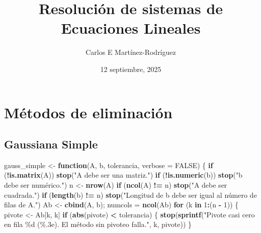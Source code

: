 \documentclass[
]{book}
\title{Resolución de sistemas de Ecuaciones Lineales}
\author{Carlos E Martínez-Rodríguez}
\date{12 septiembre, 2025}
\newenvironment{Shaded}{\begin{snugshade}}{\end{snugshade}}
\newcommand{\AttributeTok}[1]{\textcolor[rgb]{0.13,0.29,0.53}{#1}}
\newcommand{\ConstantTok}[1]{\textcolor[rgb]{0.56,0.35,0.01}{#1}}
\newcommand{\ControlFlowTok}[1]{\textcolor[rgb]{0.13,0.29,0.53}{\textbf{#1}}}
\newcommand{\DecValTok}[1]{\textcolor[rgb]{0.00,0.00,0.81}{#1}}
\newcommand{\FunctionTok}[1]{\textcolor[rgb]{0.13,0.29,0.53}{\textbf{#1}}}
\newcommand{\NormalTok}[1]{#1}
\newcommand{\OtherTok}[1]{\textcolor[rgb]{0.56,0.35,0.01}{#1}}
\newcommand{\SpecialCharTok}[1]{\textcolor[rgb]{0.81,0.36,0.00}{\textbf{#1}}}
\newcommand{\StringTok}[1]{\textcolor[rgb]{0.31,0.60,0.02}{#1}}
\begin{document}
\frontmatter
\maketitle

{
\setcounter{tocdepth}{1}
\tableofcontents
}
\mainmatter
\chapter{Métodos de eliminación}\label{muxe9todos-de-eliminaciuxf3n}

\section{Gaussiana Simple}\label{gaussiana-simple}

\begin{Shaded}
\begin{Highlighting}[]
\NormalTok{gauss\_simple }\OtherTok{\textless{}{-}} \ControlFlowTok{function}\NormalTok{(A, b, tolerancia, }\AttributeTok{verbose =} \ConstantTok{FALSE}\NormalTok{) \{}
  \ControlFlowTok{if}\NormalTok{ (}\SpecialCharTok{!}\FunctionTok{is.matrix}\NormalTok{(A)) }\FunctionTok{stop}\NormalTok{(}\StringTok{"A debe ser una matriz."}\NormalTok{)}
  \ControlFlowTok{if}\NormalTok{ (}\SpecialCharTok{!}\FunctionTok{is.numeric}\NormalTok{(b)) }\FunctionTok{stop}\NormalTok{(}\StringTok{"b debe ser numérico."}\NormalTok{)}
\NormalTok{  n }\OtherTok{\textless{}{-}} \FunctionTok{nrow}\NormalTok{(A)}
  \ControlFlowTok{if}\NormalTok{ (}\FunctionTok{ncol}\NormalTok{(A) }\SpecialCharTok{!=}\NormalTok{ n) }\FunctionTok{stop}\NormalTok{(}\StringTok{"A debe ser cuadrada."}\NormalTok{)}
  \ControlFlowTok{if}\NormalTok{ (}\FunctionTok{length}\NormalTok{(b) }\SpecialCharTok{!=}\NormalTok{ n) }\FunctionTok{stop}\NormalTok{(}\StringTok{"Longitud de b debe ser igual al número de filas de A."}\NormalTok{)}
\NormalTok{  Ab }\OtherTok{\textless{}{-}} \FunctionTok{cbind}\NormalTok{(A, b);  numcols }\OtherTok{=} \FunctionTok{ncol}\NormalTok{(Ab)}
  \ControlFlowTok{for}\NormalTok{ (k }\ControlFlowTok{in} \DecValTok{1}\SpecialCharTok{:}\NormalTok{(n }\SpecialCharTok{{-}} \DecValTok{1}\NormalTok{)) \{}
\NormalTok{    pivote }\OtherTok{\textless{}{-}}\NormalTok{ Ab[k, k]}
    \ControlFlowTok{if}\NormalTok{ (}\FunctionTok{abs}\NormalTok{(pivote) }\SpecialCharTok{\textless{}}\NormalTok{ tolerancia) \{}
      \FunctionTok{stop}\NormalTok{(}\FunctionTok{sprintf}\NormalTok{(}\StringTok{"Pivote casi cero en fila \%d (\%.3e). El método sin pivoteo falla."}\NormalTok{, k, pivote))}
\NormalTok{    \}}

\end{Highlighting}
\end{Shaded}
\end{document}
